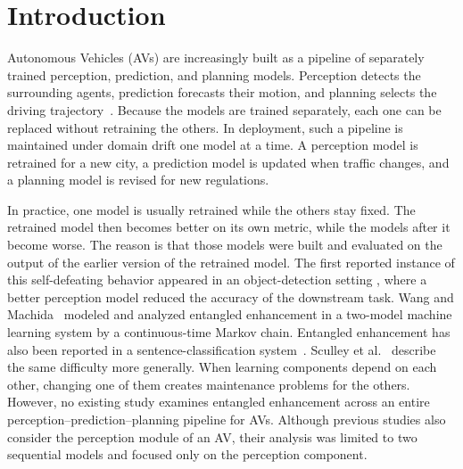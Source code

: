 \documentclass[conference]{IEEEtran}
\begin{document}
\section{Introduction}
Autonomous Vehicles (AVs) are increasingly built as a pipeline of separately trained
perception, prediction, and planning models. Perception detects the surrounding agents,
prediction forecasts their motion, and planning selects the driving trajectory~\cite{chen2024e2esurvey,hu2023uniad}. Because the models are trained separately, each one can be replaced without retraining the others. In deployment, such a pipeline is maintained under domain drift one model at a time. A perception model is
retrained for a new city, a prediction model is updated when traffic changes, and a planning model is revised for new regulations.

In practice, one model is usually retrained while the others stay fixed. The retrained model then becomes better on its own metric, while the models after it become worse. The reason is that those models were built and evaluated on the output of the earlier version of the retrained model. The first reported
instance of this self-defeating behavior appeared in an object-detection setting
\cite{wu2021fixesthatfail}, where a better perception model reduced the
accuracy of the downstream task. Wang and Machida~\cite{wang2024compsac} modeled and analyzed entangled enhancement in a two-model machine learning system by a
continuous-time Markov chain. Entangled enhancement has also been reported in a
sentence-classification system~\cite{wang2025issre}. Sculley et al.~\cite{sculley2015hidden} describe the same difficulty more generally. When learning components depend on each other, changing one of them creates maintenance problems for the others. However, no existing study examines entangled
enhancement across an entire perception--prediction--planning pipeline for
AVs. Although previous studies also consider the perception module of an AV, their analysis was limited to two sequential models and focused only on the perception component.
\end{document}
